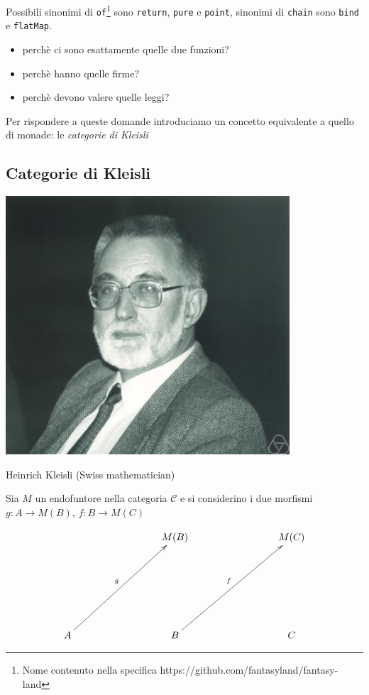 \documentclass[12pt]{article}
\begin{document}
Possibili sinonimi di \texttt{of}\footnote{Nome contenuto nella specifica https://github.com/fantasyland/fantasy-land} sono \texttt{return}, \texttt{pure} e \texttt{point}, sinonimi di \texttt{chain} sono \texttt{bind} e \texttt{flatMap}.

\begin{itemize}
  \item perchè ci sono esattamente quelle due funzioni?
  \item perchè hanno quelle firme?
  \item perchè devono valere quelle leggi?
\end{itemize}

Per rispondere a queste domande introduciamo un concetto equivalente a quello di monade: le \emph{categorie di Kleisli}

\subsection{Categorie di Kleisli}

\begin{center}
\includegraphics[scale=0.5]{kleisli}

Heinrich Kleisli (Swiss mathematician)
\end{center}

Sia $M$ un endofuntore nella categoria $\mathcal{C}$ e si considerino i due morfismi $g: A \rightarrow M(B)$, $f: B \rightarrow M(C)$

\[
\xymatrixrowsep{3cm}
\xymatrixcolsep{3cm}
\xymatrix{
  & M(B) & M(C) \\
  A \ar[ur]^g & B \ar[ur]^f & C
}
\]
\end{document}
